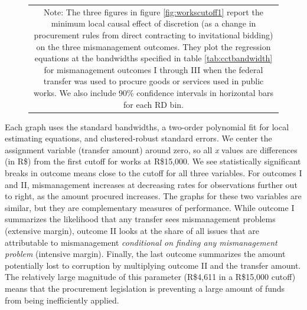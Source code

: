 \documentclass[11pt]{article}
\begin{document}
\begin{figure}[!htbp]
\begin{tabular}{ccc}
  \multicolumn{3}{p{\textwidth}}{\scriptsize Note: The three figures in figure \ref{fig:workscutoff1} report the minimum local causal effect of discretion (as a change in procurement rules from direct contracting to invitational bidding) on the three mismanagement outcomes. They plot the regression equations at the bandwidths specified in table \ref{tab:cctbandwidth} for mismanagement outcomes I through III when the federal transfer was used to procure goods or services used in public works. We also include 90\% confidence intervals in horizontal bars for each RD bin.}
  \end{tabular}
\end{figure}

Each graph uses the standard \citet{CalonicoOptimalDataDrivenRegression2015} bandwidths, a two-order polynomial fit for local estimating equations, and clustered-robust standard errors. We center the assignment variable (transfer amount) around zero, so all \emph{x} values are differences (in R\$) from the first cutoff for works at R\$15,000. We see statistically significant breaks in outcome means close to the cutoff for all three variables. For outcomes I and II, mismanagement increases at decreasing rates for observations further out to right, as the amount procured increases. The graphs for these two variables are similar, but they are complementary measures of performance. While outcome I summarizes the likelihood that any transfer sees mismanagement problems (extensive margin), outcome II looks at the share of all issues that are attributable to mismanagement \emph{conditional on finding any mismanagement problem} (intensive margin). Finally, the last outcome summarizes the amount potentially lost to corruption by multiplying outcome II and the transfer amount. The relatively large magnitude of this parameter (R\$4,611 in a R\$15,000 cutoff) means that the procurement legislation is preventing a large amount of funds from being inefficiently applied.
\end{document}
